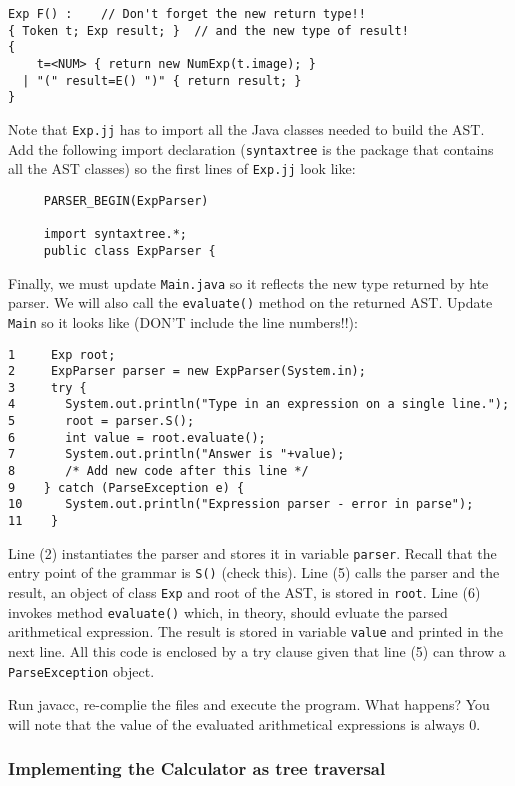 \documentclass{article}
\begin{document}
\begin{verbatim}
Exp F() :    // Don't forget the new return type!!
{ Token t; Exp result; }  // and the new type of result!
{
    t=<NUM> { return new NumExp(t.image); }
  | "(" result=E() ")" { return result; }
}
\end{verbatim}

Note that \verb+Exp.jj+ has to import all the Java classes needed to build the AST. Add  the following import declaration (\verb+syntaxtree+ is the package that contains all the AST classes) so the first lines of \verb+Exp.jj+ look like:
\begin{verbatim}
     PARSER_BEGIN(ExpParser)

     import syntaxtree.*;
     public class ExpParser {
\end{verbatim}

Finally, we must update \verb+Main.java+ so it reflects the new type returned by hte parser. We will also call the \verb+evaluate()+ method on the returned AST. Update \verb+Main+ so it looks like (DON'T include the line numbers!!):

\begin{verbatim}
1     Exp root;
2     ExpParser parser = new ExpParser(System.in);
3     try {
4       System.out.println("Type in an expression on a single line.");
5       root = parser.S();                          
6       int value = root.evaluate();        
7       System.out.println("Answer is "+value);
8       /* Add new code after this line */
9    } catch (ParseException e) {
10      System.out.println("Expression parser - error in parse");
11    }
\end{verbatim}

Line (2) instantiates the parser and stores it in variable {\tt parser}. Recall that the entry point of the grammar is {\tt S()} (check this). Line (5) calls the parser and the result, an object of class {\tt Exp} and root of the AST, is stored in {\tt root}. Line (6) invokes method \verb+evaluate()+ which, in theory, should evluate the parsed arithmetical expression.
The result is stored in variable {\tt value} and printed in the next line. All this code is enclosed by a try clause given that line (5) can throw a {\tt ParseException} object. 

Run javacc, re-complie the files and execute the program. What happens? You will note that the value of the evaluated arithmetical expressions is always 0.

\subsubsection*{Implementing the Calculator as tree traversal}
\end{document}
